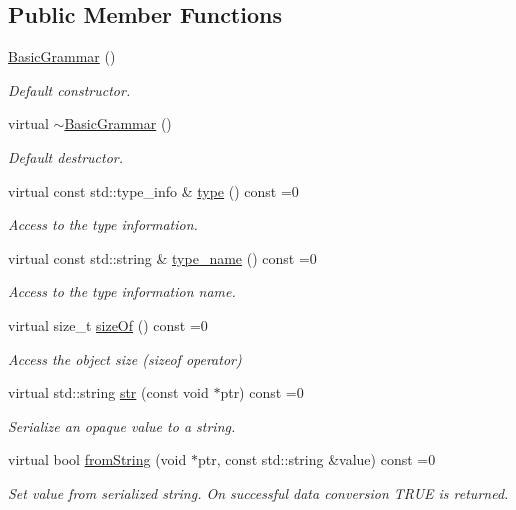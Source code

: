 \subsection*{Public Member Functions}
\begin{DoxyCompactItemize}
\item 
\hyperlink{class_d_d4hep_1_1_basic_grammar_adda1bb3c1b1167a1f81688092a40f02a}{Basic\+Grammar} ()
\begin{DoxyCompactList}\small\item\em Default constructor. \end{DoxyCompactList}\item 
virtual \hyperlink{class_d_d4hep_1_1_basic_grammar_a9110ad3238c79f23fb42cdf69d3322b9}{$\sim$\+Basic\+Grammar} ()
\begin{DoxyCompactList}\small\item\em Default destructor. \end{DoxyCompactList}\item 
virtual const std\+::type\+\_\+info \& \hyperlink{class_d_d4hep_1_1_basic_grammar_a697d38c53f67a86bb182350dad284402}{type} () const =0
\begin{DoxyCompactList}\small\item\em Access to the type information. \end{DoxyCompactList}\item 
virtual const std\+::string \& \hyperlink{class_d_d4hep_1_1_basic_grammar_acae3770beb2e60eaf76c7d85722c8bc2}{type\+\_\+name} () const =0
\begin{DoxyCompactList}\small\item\em Access to the type information name. \end{DoxyCompactList}\item 
virtual size\+\_\+t \hyperlink{class_d_d4hep_1_1_basic_grammar_a5e2ae03f6371357d3da7e082bbeabb0d}{size\+Of} () const =0
\begin{DoxyCompactList}\small\item\em Access the object size (sizeof operator) \end{DoxyCompactList}\item 
virtual std\+::string \hyperlink{class_d_d4hep_1_1_basic_grammar_a92fb01e1333540f417ef8151e774fd72}{str} (const void $\ast$ptr) const =0
\begin{DoxyCompactList}\small\item\em Serialize an opaque value to a string. \end{DoxyCompactList}\item 
virtual bool \hyperlink{class_d_d4hep_1_1_basic_grammar_adf08fd5e01cf623c8b0e239bbe0b1868}{from\+String} (void $\ast$ptr, const std\+::string \&value) const =0
\begin{DoxyCompactList}\small\item\em Set value from serialized string. On successful data conversion T\+R\+UE is returned. \end{DoxyCompactList}\end{DoxyCompactItemize}
